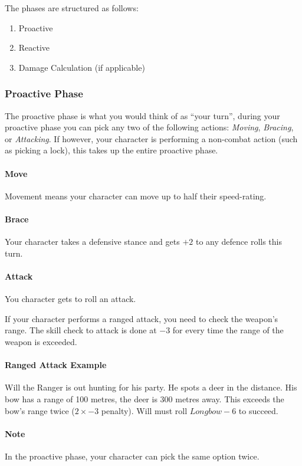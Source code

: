 The phases are structured as follows:
\begin{enumerate}
  \item Proactive 
  \item Reactive
  \item Damage Calculation (if applicable)
\end{enumerate}

\subsubsection{Proactive Phase}
The proactive phase is what you would think of as ``your turn'', during your proactive phase you can pick any two of the following actions: \textit{Moving}, \textit{Bracing}, or \textit{Attacking}.
If however, your character is performing a non-combat action (such as picking a lock), this takes up the entire proactive phase.

\paragraph{Move}
Movement means your character can move up to half their speed-rating.

\paragraph{Brace}
Your character takes a defensive stance and gets $+2$ to any defence rolls this turn.

\paragraph{Attack}
You character gets to roll an attack.

If your character performs a ranged attack, you need to check the weapon's range.
The skill check to attack is done at $-3$ for every time the range of the weapon is exceeded.

\paragraph{Ranged Attack Example} Will the Ranger is out hunting for his party. He spots a deer in the distance. His bow has a range of 100 metres, the deer is 300 metres away. This exceeds the bow's range twice ($2\times -3$ penalty). Will must roll $Longbow-6$ to succeed.

\paragraph{Note} In the proactive phase, your character can pick the same option twice.


